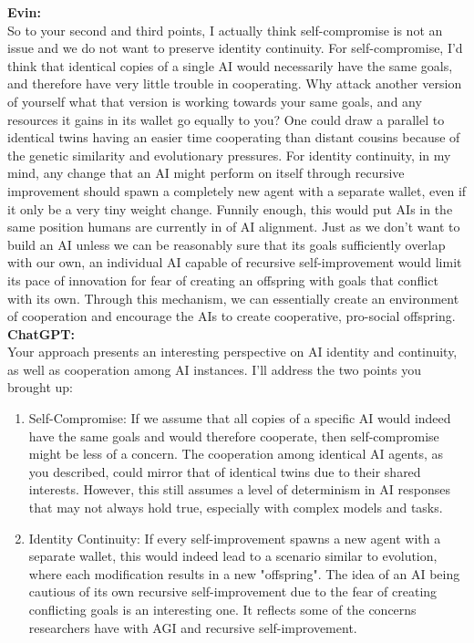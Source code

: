 \documentclass{article}[10pt]
\begin{document}
\noindent \textbf{Evin:}\\
So to your second and third points, I actually think self-compromise is not an issue and we do not want to preserve identity continuity. 
For self-compromise, I'd think that identical copies of a single AI would necessarily have the same goals, and therefore have very little trouble in cooperating. 
Why attack another version of yourself what that version is working towards your same goals, and any resources it gains in its wallet go equally to you? 
One could draw a parallel to identical twins having an easier time cooperating than distant cousins because of the genetic similarity and evolutionary pressures. 
For identity continuity, in my mind, any change that an AI might perform on itself through recursive improvement should spawn a completely new agent with a separate wallet, even if it only be a very tiny weight change. 
Funnily enough, this would put AIs in the same position humans are currently in of AI alignment. 
Just as we don't want to build an AI unless we can be reasonably sure that its goals sufficiently overlap with our own, an individual AI capable of recursive self-improvement would limit its pace of innovation for fear of creating an offspring with goals that conflict with its own. 
Through this mechanism, we can essentially create an environment of cooperation and encourage the AIs to create cooperative, pro-social offspring.\\

\noindent \textbf{ChatGPT:}\\
Your approach presents an interesting perspective on AI identity and continuity, as well as cooperation among AI instances. 
I'll address the two points you brought up:
\begin{enumerate}
    \item Self-Compromise: 
    If we assume that all copies of a specific AI would indeed have the same goals and would therefore cooperate, then self-compromise might be less of a concern. 
    The cooperation among identical AI agents, as you described, could mirror that of identical twins due to their shared interests. 
    However, this still assumes a level of determinism in AI responses that may not always hold true, especially with complex models and tasks.
    \item Identity Continuity: 
    If every self-improvement spawns a new agent with a separate wallet, this would indeed lead to a scenario similar to evolution, where each modification results in a new "offspring". 
    The idea of an AI being cautious of its own recursive self-improvement due to the fear of creating conflicting goals is an interesting one. 
    It reflects some of the concerns researchers have with AGI and recursive self-improvement.
\end{enumerate}
\end{document}
